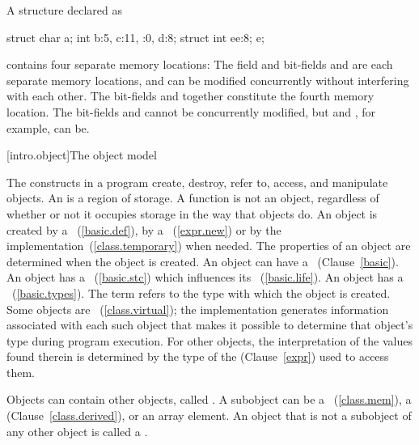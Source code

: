 \pnum
\enterexample A structure declared as

\begin{codeblock}
struct {
  char a;
  int b:5,
  c:11,
  :0,
  d:8;
  struct {int ee:8;} e;
}
\end{codeblock}

contains four separate memory locations: The field  and bit-fields
 and  are each separate memory locations, and can be
modified concurrently without interfering with each other. The bit-fields
 and  together constitute the fourth memory location. The
bit-fields  and  cannot be concurrently modified, but
 and , for example, can be. \exitexample%

[intro.object]{The \Cpp object model}

\pnum
{}%
%
The constructs in a \Cpp program create, destroy, refer to, access, and
manipulate objects. An  is a region of storage.
\enternote A function is not an object, regardless of whether or not it
occupies storage in the way that objects do. \exitnote An object is
created by a ~(\ref{basic.def}), by a
~(\ref{expr.new}) or by the
implementation~(\ref{class.temporary}) when needed. The properties of an
object are determined when the object is created. An object can have a
~(Clause~\ref{basic}). An object has a ~(\ref{basic.stc}) which influences its
~(\ref{basic.life}). An object has a
~(\ref{basic.types}). The term  refers to
the type with which the object is created.
Some objects are
~(\ref{class.virtual}); the implementation
generates information associated with each such object that makes it
possible to determine that object's type during program execution. For
other objects, the interpretation of the values found therein is
determined by the type of the  (Clause~\ref{expr})
used to access them.

\pnum
{}%
Objects can contain other objects, called .
A subobject can be
a ~(\ref{class.mem}), a 
(Clause~\ref{class.derived}), or an array element.
%
An object that is not a subobject of any other object is called a .

